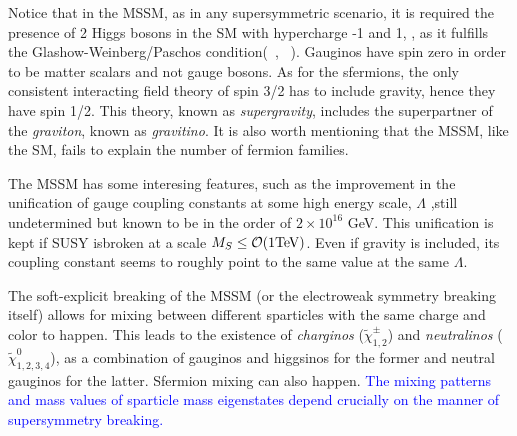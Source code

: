 Notice that in the MSSM, as in any supersymmetric scenario, it is required the presence of 2 Higgs bosons in the SM with hypercharge -1 and 1, , as it fulfills the Glashow-Weinberg/Paschos condition(~\cite{Pascos1}, ~\cite{Pascos2}).  Gauginos have spin zero in order to be matter scalars and not gauge bosons. As for the sfermions, the only consistent interacting field theory of spin 3/2 has to include gravity, hence they have spin 1/2. This theory, known as \textit{supergravity}, includes the superpartner of the \textit{graviton}, known as \textit{gravitino}. It is also worth mentioning that the MSSM, like the SM, fails to explain the number of fermion families. 

The MSSM has some interesing features, such as the improvement in the unification of gauge coupling constants at some high energy scale, $\Lambda$ ,still undetermined but known to be  in the order of $2\times10^{16}$ GeV. This unification is kept if SUSY isbroken at a scale $M_S \leq \mathcal{O} (1 \rm TeV)$. Even if gravity is included, its coupling constant seems to roughly point to the same value at the same $\Lambda$.


The soft-explicit breaking of the MSSM (or the electroweak symmetry breaking itself) allows for mixing between different sparticles with the same charge and color to happen. This leads to the existence of \textit{charginos} ($\tilde{\chi}^{\pm}_{1,2}$) and \textit{neutralinos} ($\tilde{\chi}^{0}_{1,2,3,4}$), as a combination of gauginos and higgsinos for the former and neutral gauginos for the latter. Sfermion mixing can also happen. \textcolor{blue}{The mixing patterns and mass values of sparticle mass eigenstates depend crucially on the manner of supersymmetry breaking.} 


